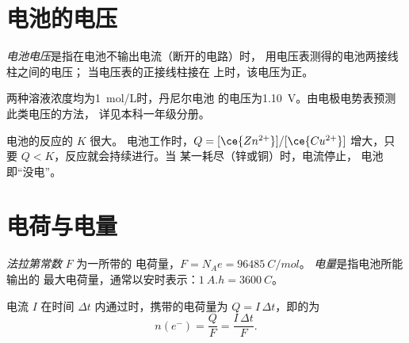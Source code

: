 \section{电池的电压}

\begin{definition}[电池电压]\label{def:g12:cells-and-electrolysis:emf}
\emph{电池电压}是指在电池不输出电流（断开的电路）时，
用电压表测得的电池两接线柱之间的电压；
当电压表的正接线柱接在
上时，该电压为正。
\end{definition}

\begin{example}[丹尼尔电池]\label{ex:g12:cells-and-electrolysis:daniell}
两种溶液浓度均为\qty{1}{mol/L}时，丹尼尔电池
的电压为\qty{1.10}{V}。由电极电势表预测此类电压的方法，
详见本科一年级分册。
\end{example}

\begin{remark}[电池为何会耗尽]\label{rem:g12:cells-and-electrolysis:runs-down}
电池的反应的 $K$ 很大。
电池工作时，$Q = [\ce{Zn^{2+}}]/[\ce{Cu^{2+}}]$
增大，只要 $Q < K$，反应就会持续进行。当
某一耗尽（锌或铜）时，电流停止，
电池即“没电”。
\end{remark}

\section{电荷与电量}

\begin{definition}[法拉第常数，电量]\label{def:g12:cells-and-electrolysis:capacity}
\emph{法拉第常数} $F$ 为一所带的
电荷量，$F = N_A e = \qty{96485}{C/mol}$。
\emph{电量}是指电池所能输出的
最大电荷量，通常以安时表示：$\qty{1}{A.h} = \qty{3600}{C}$。
\end{definition}

\begin{proposition}[电荷与电子的物质的量]\label{prop:g12:cells-and-electrolysis:charge}
电流 $I$ 在时间 $\Delta t$ 内通过时，携带的电荷量为
$Q = I\,\Delta t$，即的为
\[
  n(e^-) = \frac{Q}{F} = \frac{I\,\Delta t}{F} .
\]
\end{proposition}

